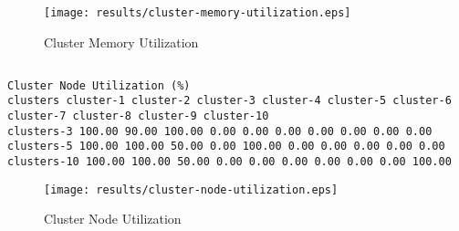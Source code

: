 \documentclass{elsart}
\begin{document}
\begin{figure}[ht]
\centering
\texttt{[image: results/cluster-memory-utilization.eps]}
\caption{Cluster Memory Utilization}\label{fig:cluster-memory-utilization.eps}
\end{figure}

\subsection{}

\begin{lstlisting}[caption={Cluster Node Utilization}]
Cluster Node Utilization (%)
clusters cluster-1 cluster-2 cluster-3 cluster-4 cluster-5 cluster-6 cluster-7 cluster-8 cluster-9 cluster-10
clusters-3 100.00 90.00 100.00 0.00 0.00 0.00 0.00 0.00 0.00 0.00
clusters-5 100.00 100.00 50.00 0.00 100.00 0.00 0.00 0.00 0.00 0.00
clusters-10 100.00 100.00 50.00 0.00 0.00 0.00 0.00 0.00 0.00 100.00
\end{lstlisting}

\begin{figure}[ht]
\centering
\texttt{[image: results/cluster-node-utilization.eps]}
\caption{Cluster Node Utilization}\label{fig:cluster-node-utilization.eps}
\end{figure}
\end{document}
